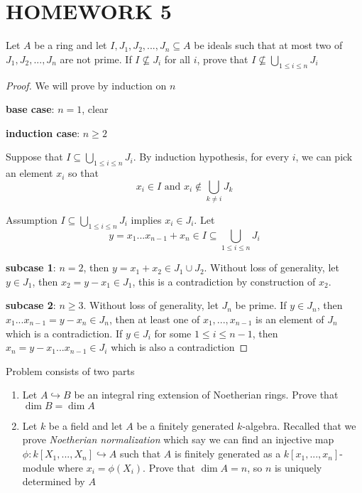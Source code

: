 \chapter{HOMEWORK 5}

\begin{problem}
	Let $A$ be a ring and let $I, J_1, J_2, ..., J_n \subseteq A$ be ideals such that at most two of $J_1, J_2, ..., J_n$ are not prime. If $I \nsubseteq J_i$ for all $i$, prove that $I \nsubseteq \bigcup_{1 \leq i \leq n} J_i$
\end{problem}

\begin{proof}
	We will prove by induction on $n$
	
	\textbf{base case}: $n = 1$, clear
	
	\textbf{induction case}: $n \geq 2$
	
	Suppose that $I \subseteq \bigcup_{1 \leq i \leq n} J_i$. By induction hypothesis, for every $i$, we can pick an element $x_i$ so that
	$$
		x_i \in I \text{ and } x_i \notin \bigcup_{k \neq i} J_k
	$$
	
	Assumption $I \subseteq \bigcup_{1 \leq i \leq n} J_i$ implies $x_i \in J_i$. Let
	$$
		y = x_1 ... x_{n-1} + x_n \in I \subseteq \bigcup_{1 \leq i \leq n} J_i
	$$
	
	\textbf{subcase 1}: $n = 2$, then $y = x_1 + x_2 \in J_1 \cup J_2$. Without loss of generality, let $y \in J_1$, then $x_2 = y - x_1 \in J_1$, this is a contradiction by construction of $x_2$.
	
	\textbf{subcase 2}: $n \geq 3$. Without loss of generality, let $J_n$ be prime. If $y \in J_n$, then $x_1 ... x_{n-1} = y - x_n \in J_n$, then at least one of $x_1, ..., x_{n-1}$ is an element of $J_n$ which is a contradiction. If $y \in J_i$ for some $1 \leq i \leq n-1$, then $x_n = y - x_1 ... x_{n-1} \in J_i$ which is also a contradiction
\end{proof}

\begin{problem}
	\label{problem2}
	Problem consists of two parts
	\begin{enumerate}
		\item Let $A \hookrightarrow B$ be an integral ring extension of Noetherian rings. Prove that $\dim B = \dim A$
		
		\item Let $k$ be a field and let $A$ be a finitely generated $k$-algebra. Recalled that we prove \textit{Noetherian normalization} which say we can find an injective map $\phi: k[X_1, ..., X_n] \hookrightarrow A$ such that $A$ is finitely generated as a $k[x_1, ..., x_n]$-module where $x_i = \phi(X_i)$. Prove that $\dim A = n$, so $n$ is uniquely determined by $A$
	\end{enumerate}
\end{problem}

